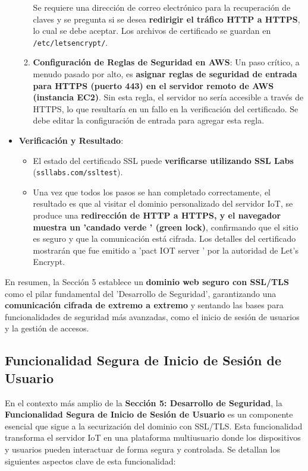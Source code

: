 \documentclass{report}
\begin{document}
\begin{itemize}
\begin{enumerate}
    Se requiere una dirección de correo electrónico para la recuperación de claves y se pregunta si se desea \textbf{redirigir el tráfico HTTP a HTTPS}, 
    lo cual se debe aceptar. Los archivos de certificado se guardan en \verb|/etc/letsencrypt/|.
        \item \textbf{Configuración de Reglas de Seguridad en AWS}: Un paso crítico, a menudo pasado por alto, es \textbf{asignar reglas de seguridad de 
        entrada para HTTPS (puerto 443) en el servidor remoto de AWS (instancia EC2)}. Sin esta regla, el servidor no sería accesible a través de HTTPS, 
        lo que resultaría en un fallo en la verificación del certificado. Se debe editar la configuración de entrada para agregar esta regla.
    \end{enumerate}
    \item \textbf{Verificación y Resultado}:
    \begin{itemize}
    \item El estado del certificado SSL puede \textbf{verificarse utilizando SSL Labs} (\verb|ssllabs.com/ssltest|).
        \item Una vez que todos los pasos se han completado correctamente, el resultado es que al visitar el dominio personalizado del servidor IoT, se 
        produce una \textbf{redirección de HTTP a HTTPS, y el navegador muestra un  'candado verde ' (green lock)}, confirmando que el sitio es seguro y 
        que la comunicación está cifrada. Los detalles del certificado mostrarán que fue emitido a  'pact IOT server ' por la autoridad de Let's Encrypt.
    \end{itemize}
\end{itemize}
En resumen, la Sección 5 establece un \textbf{dominio web seguro con SSL/TLS} como el pilar fundamental del  'Desarrollo de Seguridad', garantizando una 
\textbf{comunicación cifrada de extremo a extremo} y sentando las bases para funcionalidades de seguridad más avanzadas, como el inicio de sesión de 
usuarios y la gestión de accesos.

\subsection{Funcionalidad Segura de Inicio de Sesión de Usuario}
En el contexto más amplio de la \textbf{Sección 5: Desarrollo de Seguridad}, la \textbf{Funcionalidad Segura de Inicio de Sesión de Usuario} es un 
componente esencial que sigue a la securización del dominio con SSL/TLS. Esta funcionalidad transforma el servidor IoT en una plataforma multiusuario 
donde los dispositivos y usuarios pueden interactuar de forma segura y controlada. Se detallan los siguientes aspectos clave de esta funcionalidad:
\end{document}
